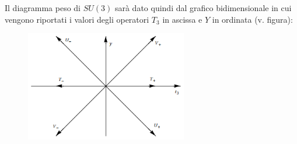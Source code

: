 \documentclass[12pt,a4paper]{article}
\theoremstyle{definition}
\numberwithin{equation}{section}
\begin{document}
Il diagramma peso di $SU(3)$ sarà dato quindi dal grafico bidimensionale in cui vengono riportati i valori degli operatori $T_3$ in ascissa e $Y$ in ordinata (v. figura):
\begin{figure}[h]
\centering
\includegraphics[width=200pt,keepaspectratio=true]{Addons/pesosu3}
\end{figure}
\end{document}

